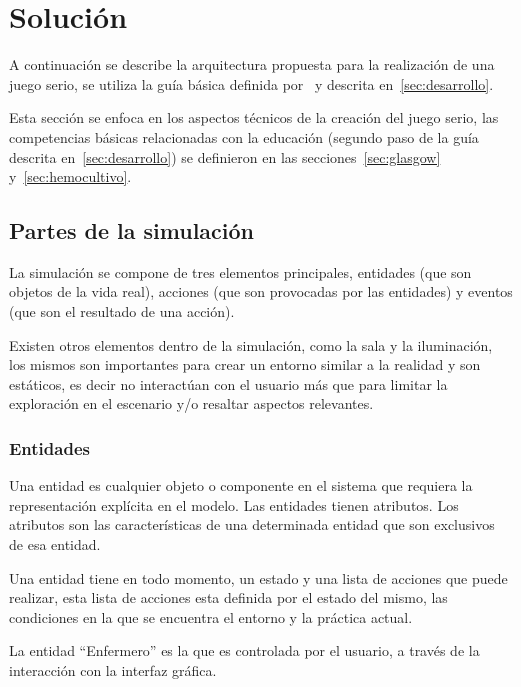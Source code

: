 
\section{Solución}
\label{sec:solucion}


A continuación se describe la arquitectura propuesta para la realización de una
juego serio, se utiliza la guía básica definida por~\cite{pereira2009design} y
descrita en~\ref{sec:desarrollo}.

Esta sección se enfoca en los aspectos técnicos de la creación del juego serio,
las competencias básicas relacionadas con la educación (segundo paso de la guía
descrita en~\ref{sec:desarrollo}) se definieron en las
secciones~\ref{sec:glasgow} y~\ref{sec:hemocultivo}.

\subsection{Partes de la simulación}

La simulación se compone de tres elementos principales, entidades (que son
objetos de la vida real), acciones (que son provocadas por las entidades) y
eventos (que son el resultado de una acción). 

Existen otros elementos dentro de la simulación, como la sala y la iluminación,
los mismos son importantes para crear un entorno similar a la realidad y son
estáticos, es decir no interactúan con el usuario más que para limitar la
exploración en el escenario y/o resaltar aspectos relevantes.

\subsubsection{Entidades}

Una entidad es cualquier objeto o componente en el sistema que requiera la representación
explícita en el modelo\cite{banks2000dm}. Las entidades tienen atributos. Los
atributos son las características de una determinada entidad que son exclusivos
de esa entidad.

Una entidad tiene en todo momento, un estado y una lista de acciones que
puede realizar, esta lista de acciones esta definida por el estado del mismo,
las condiciones en la que se encuentra el entorno y la práctica actual.

La entidad \enquote{Enfermero} es la que es controlada por el usuario, a través
de la interacción con la interfaz gráfica.

